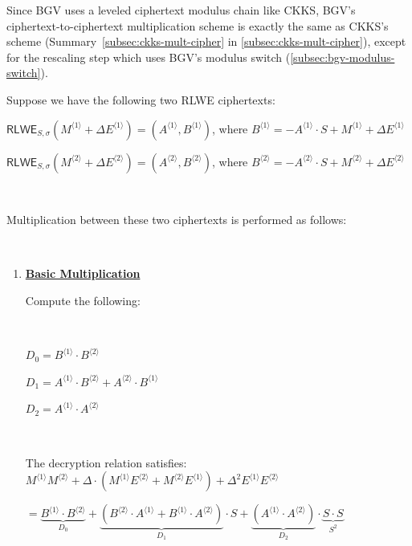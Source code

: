 Since BGV uses a leveled ciphertext modulus chain like CKKS, BGV's ciphertext-to-ciphertext multiplication scheme is exactly the same as CKKS's scheme (Summary~\ref*{subsec:ckks-mult-cipher} in \autoref{subsec:ckks-mult-cipher}), except for the rescaling step which uses BGV's modulus switch (\autoref{subsec:bgv-modulus-switch}). 

\begin{tcolorbox}[title={\textbf{\tboxlabel{\ref*{subsec:bgv-mult-cipher}} BGV Ciphertext-to-Ciphertext Multiplication}}]

Suppose we have the following two RLWE ciphertexts:

$\textsf{RLWE}_{S, \sigma}(M^{\langle 1 \rangle} + \Delta E^{\langle 1 \rangle}) = (A^{\langle 1 \rangle}, B^{\langle 1 \rangle})$, \text{ } where $B^{\langle 1 \rangle} = -A^{\langle 1 \rangle} \cdot S +  M^{\langle 1 \rangle} + \Delta E^{\langle 1 \rangle}$

$\textsf{RLWE}_{S, \sigma}(M^{\langle 2 \rangle} + \Delta E^{\langle 2 \rangle}) = (A^{\langle 2 \rangle}, B^{\langle 2 \rangle})$, \text{ } where $B^{\langle 2 \rangle} = -A^{\langle 2 \rangle} \cdot S +  M^{\langle 2 \rangle} + \Delta E^{\langle 2 \rangle}$

$ $

Multiplication between these two ciphertexts is performed as follows:

$ $

\begin{enumerate}
\item \textbf{\underline{Basic Multiplication}}

Compute the following:

$ $

$D_0 = B^{\langle 1 \rangle}\cdot B^{\langle 2 \rangle}$

$D_1 = A^{\langle 1 \rangle}\cdot B^{\langle 2 \rangle} + A^{\langle 2 \rangle}\cdot B^{\langle 1 \rangle}$

$D_2 = A^{\langle 1 \rangle} \cdot A^{\langle 2 \rangle}$

$ $

The decryption relation satisfies: $M^{\langle 1 \rangle}M^{\langle 2 \rangle} + \Delta\cdot (M^{\langle 1 \rangle}E^{\langle 2 \rangle} + M^{\langle 2 \rangle}E^{\langle 1 \rangle}) + \Delta^2E^{\langle 1 \rangle}E^{\langle 2 \rangle}$

$ = \underbrace{B^{\langle 1 \rangle}\cdot B^{\langle 2 \rangle}}_{D_0}  + \underbrace{(B^{\langle 2 \rangle}\cdot A^{\langle 1 \rangle} + B^{\langle 1 \rangle}\cdot A^{\langle 2 \rangle})}_{D_1} \cdot S + \underbrace{(A^{\langle 1 \rangle} \cdot A^{\langle 2 \rangle})}_{D_2} \cdot \underbrace{S \cdot S}_{S^2}$


\end{enumerate}
\end{tcolorbox}
